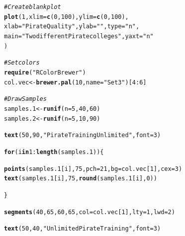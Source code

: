 \documentclass{tufte-book}\usepackage[]{graphicx}\usepackage[]{color}
\makeatletter
\newcommand{\hlnum}[1]{\textcolor[rgb]{0.686,0.059,0.569}{#1}}%
\newcommand{\hlstr}[1]{\textcolor[rgb]{0.192,0.494,0.8}{#1}}%
\newcommand{\hlcom}[1]{\textcolor[rgb]{0.678,0.584,0.686}{\textit{#1}}}%
\newcommand{\hlopt}[1]{\textcolor[rgb]{0,0,0}{#1}}%
\newcommand{\hlstd}[1]{\textcolor[rgb]{0.345,0.345,0.345}{#1}}%
\newcommand{\hlkwa}[1]{\textcolor[rgb]{0.161,0.373,0.58}{\textbf{#1}}}%
\newcommand{\hlkwb}[1]{\textcolor[rgb]{0.69,0.353,0.396}{#1}}%
\newcommand{\hlkwc}[1]{\textcolor[rgb]{0.333,0.667,0.333}{#1}}%
\newcommand{\hlkwd}[1]{\textcolor[rgb]{0.737,0.353,0.396}{\textbf{#1}}}%
\newenvironment{kframe}{%
 \def\at@end@of@kframe{}%
 \ifinner\ifhmode%
  \def\at@end@of@kframe{\end{minipage}}%
  \begin{minipage}{\columnwidth}%
 \fi\fi%
 \def\FrameCommand##1{\hskip\@totalleftmargin \hskip-\fboxsep
 \colorbox{shadecolor}{##1}\hskip-\fboxsep
     \hskip-\linewidth \hskip-\@totalleftmargin \hskip\columnwidth}%
 \MakeFramed {\advance\hsize-\width
   \@totalleftmargin\z@ \linewidth\hsize
   \@setminipage}}%
 {\par\unskip\endMakeFramed%
 \at@end@of@kframe}
\newenvironment{knitrout}{}{} %
\makeatother
\begin{document}
\begin{marginfigure}
\begin{tiny}
\begin{knitrout}
\color{fgcolor}\begin{kframe}
\begin{alltt}
\hlcom{# Create blank plot}
\hlkwd{plot}\hlstd{(}\hlnum{1}\hlstd{,} \hlkwc{xlim} \hlstd{=} \hlkwd{c}\hlstd{(}\hlnum{0}\hlstd{,} \hlnum{100}\hlstd{),} \hlkwc{ylim} \hlstd{=} \hlkwd{c}\hlstd{(}\hlnum{0}\hlstd{,} \hlnum{100}\hlstd{),}
     \hlkwc{xlab} \hlstd{=} \hlstr{"Pirate Quality"}\hlstd{,} \hlkwc{ylab} \hlstd{=} \hlstr{""}\hlstd{,} \hlkwc{type} \hlstd{=} \hlstr{"n"}\hlstd{,}
     \hlkwc{main} \hlstd{=} \hlstr{"Two different Pirate colleges"}\hlstd{,} \hlkwc{yaxt} \hlstd{=} \hlstr{"n"}
     \hlstd{)}

\hlcom{# Set colors}
\hlkwd{require}\hlstd{(}\hlstr{"RColorBrewer"}\hlstd{)}
\hlstd{col.vec} \hlkwb{<-} \hlkwd{brewer.pal}\hlstd{(}\hlnum{10}\hlstd{,} \hlkwc{name} \hlstd{=} \hlstr{"Set3"}\hlstd{)[}\hlnum{4}\hlopt{:}\hlnum{6}\hlstd{]}

\hlcom{# Draw Samples}
\hlstd{samples.1} \hlkwb{<-} \hlkwd{runif}\hlstd{(}\hlkwc{n} \hlstd{=} \hlnum{5}\hlstd{,} \hlnum{40}\hlstd{,} \hlnum{60}\hlstd{)}
\hlstd{samples.2} \hlkwb{<-} \hlkwd{runif}\hlstd{(}\hlkwc{n} \hlstd{=} \hlnum{5}\hlstd{,} \hlnum{10}\hlstd{,} \hlnum{90}\hlstd{)}

\hlkwd{text}\hlstd{(}\hlnum{50}\hlstd{,} \hlnum{90}\hlstd{,} \hlstr{"Pirate Training Unlimited"}\hlstd{,} \hlkwc{font} \hlstd{=} \hlnum{3}\hlstd{)}

\hlkwa{for}\hlstd{(i} \hlkwa{in} \hlnum{1}\hlopt{:}\hlkwd{length}\hlstd{(samples.1)) \{}

  \hlkwd{points}\hlstd{(samples.1[i],} \hlnum{75}\hlstd{,} \hlkwc{pch} \hlstd{=} \hlnum{21}\hlstd{,} \hlkwc{bg} \hlstd{= col.vec[}\hlnum{1}\hlstd{],} \hlkwc{cex} \hlstd{=} \hlnum{3}\hlstd{)}
  \hlkwd{text}\hlstd{(samples.1[i],} \hlnum{75}\hlstd{,} \hlkwd{round}\hlstd{(samples.1[i],} \hlnum{0}\hlstd{))}

\hlstd{\}}

\hlkwd{segments}\hlstd{(}\hlnum{40}\hlstd{,} \hlnum{65}\hlstd{,} \hlnum{60}\hlstd{,} \hlnum{65}\hlstd{,} \hlkwc{col} \hlstd{= col.vec[}\hlnum{1}\hlstd{],} \hlkwc{lty} \hlstd{=} \hlnum{1}\hlstd{,} \hlkwc{lwd} \hlstd{=} \hlnum{2}\hlstd{)}

\hlkwd{text}\hlstd{(}\hlnum{50}\hlstd{,} \hlnum{40}\hlstd{,} \hlstr{"Unlimited Pirate Training"}\hlstd{,} \hlkwc{font} \hlstd{=} \hlnum{3}\hlstd{)}


\end{alltt}
\end{kframe}
\end{knitrout}
\end{tiny}
\end{marginfigure}
\end{document}

